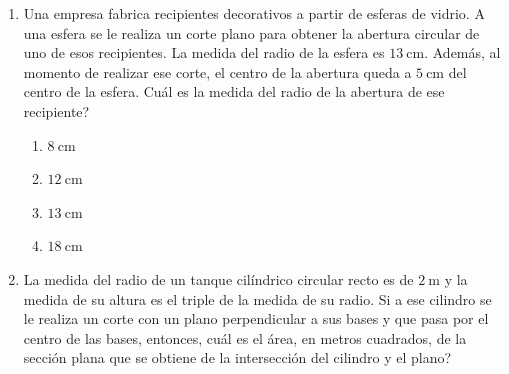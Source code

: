 \documentclass[11pt]{article}
\newcommand{\opcion}[2]{\item $#2$}
\begin{document}
\begin{enumerate}[label=\textbf{\arabic*.}, itemsep=2.5cm]
\begin{center}

\vspace{0.55cm}

\end{center}

De acuerdo con la informaci\'on anterior, el per\'imetro, en metros, de esa puerta decorativa es

\begin{enumerate}[label=\Alph*)]
  \item mayor que $12$, pero menor que $13$.
  \item mayor que $14$, pero menor que $15$.
  \item mayor que $15$, pero menor que $16$.
  \item mayor que $10$, pero menor que $12$.
\end{enumerate}

\Needspace{0.64\textheight}
\item
Una empresa fabrica recipientes decorativos a partir de esferas de vidrio. A una esfera se le realiza un corte plano para obtener la abertura circular de uno de esos recipientes. La medida del radio de la esfera es $13\ \text{cm}$. Adem\'as, al momento de realizar ese corte, el centro de la abertura queda a $5\ \text{cm}$ del centro de la esfera. \textquestiondown Cu\'al es la medida del radio de la abertura de ese recipiente?

\begin{enumerate}[label=\Alph*)]
  \opcion{A}{8\ \text{cm}}
  \opcion{B}{12\ \text{cm}}
  \opcion{C}{13\ \text{cm}}
  \opcion{D}{18\ \text{cm}}
\end{enumerate}

\Needspace{0.64\textheight}
\item
La medida del radio de un tanque cil\'indrico circular recto es de $2\ \text{m}$ y la medida de su altura es el triple de la medida de su radio. Si a ese cilindro se le realiza un corte con un plano perpendicular a sus bases y que pasa por el centro de las bases, entonces, \textquestiondown cu\'al es el \'area, en metros cuadrados, de la secci\'on plana que se obtiene de la intersecci\'on del cilindro y el plano?


\end{enumerate}
\end{document}
